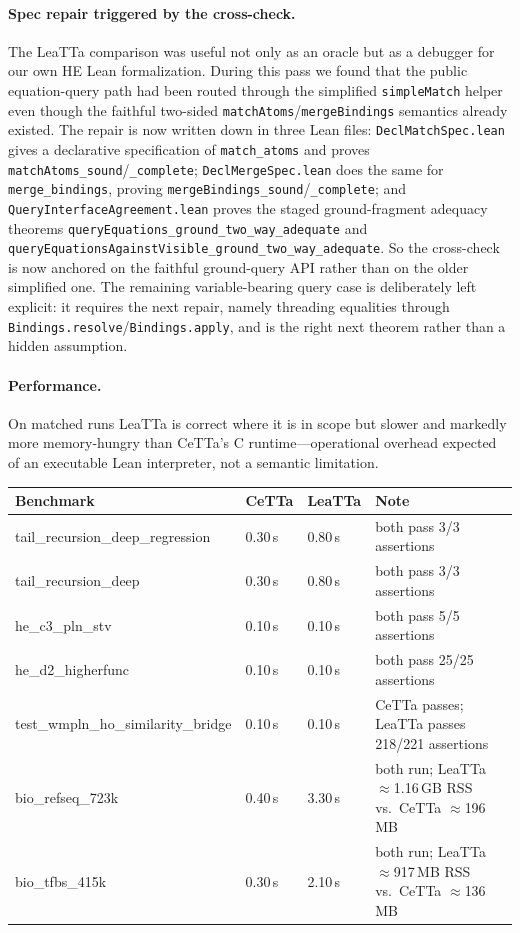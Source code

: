 \documentclass[11pt]{article}
\newcommand{\code}[1]{\texttt{#1}}
\newcommand{\HE}{\textup{HE}}
\newcommand{\CeTTa}{\textup{CeTTa}}
\newcommand{\LeaTTa}{\textup{LeaTTa}}
\begin{document}
\paragraph{Spec repair triggered by the cross-check.}
The \LeaTTa{} comparison was useful not only as an oracle but as a
debugger for our own \HE{} Lean formalization.  During this pass we found that
the public equation-query path had been routed through the simplified
\code{simpleMatch} helper even though the faithful two-sided
\code{matchAtoms}/\code{mergeBindings} semantics already existed.  The
repair is now written down in three Lean files:
\code{DeclMatchSpec.lean} gives a declarative specification of
\code{match\_atoms} and proves \code{matchAtoms\_sound}/\code{\_complete};
\code{DeclMergeSpec.lean} does the same for
\code{merge\_bindings}, proving \code{mergeBindings\_sound}/\code{\_complete};
and \code{QueryInterfaceAgreement.lean} proves the staged ground-fragment
adequacy theorems
\code{queryEquations\_ground\_two\_way\_adequate} and
\code{queryEquationsAgainstVisible\_ground\_two\_way\_adequate}.  So the
cross-check is now anchored on the faithful ground-query API rather
than on the older simplified one.  The remaining variable-bearing query
case is deliberately left explicit: it requires the next repair, namely
threading equalities through \code{Bindings.resolve}/\code{Bindings.apply},
and is the right next theorem rather than a hidden assumption.

\paragraph{Performance.}
On matched runs \LeaTTa{} is correct where it is in scope but slower and
markedly more memory-hungry than \CeTTa{}'s C runtime---operational
overhead expected of an executable Lean interpreter, not a semantic
limitation.

\begin{center}
\small
\begin{tabular}{p{4.2cm}p{2.1cm}p{2.1cm}p{5.9cm}}
\toprule
Benchmark & \CeTTa{} & \LeaTTa{} & Note \\
\midrule
tail\_recursion\_deep\_regression & 0.30\,s & 0.80\,s &
both pass 3/3 assertions \\
tail\_recursion\_deep & 0.30\,s & 0.80\,s &
both pass 3/3 assertions \\
he\_c3\_pln\_stv & 0.10\,s & 0.10\,s &
both pass 5/5 assertions \\
he\_d2\_higherfunc & 0.10\,s & 0.10\,s &
both pass 25/25 assertions \\
test\_wmpln\_ho\_similarity\_bridge & 0.10\,s & 0.10\,s &
\CeTTa{} passes; \LeaTTa{} passes 218/221 assertions \\
bio\_refseq\_723k & 0.40\,s & 3.30\,s &
both run; \LeaTTa{} $\approx$1.16\,GB RSS vs.\ \CeTTa{} $\approx$196\,MB \\
bio\_tfbs\_415k & 0.30\,s & 2.10\,s &
both run; \LeaTTa{} $\approx$917\,MB RSS vs.\ \CeTTa{} $\approx$136\,MB \\
\bottomrule
\end{tabular}
\normalsize
\end{center}
\end{document}
